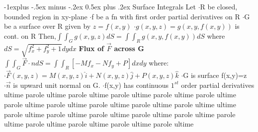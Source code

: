 \documentclass[10pt,landscape]{article}
\makeatletter
\renewcommand{\subsection}{\@startsection{subsection}{2}{0mm}%
                                {-1explus -.5ex minus -.2ex}%
                                {0.5ex plus .2ex}%
                                {\normalfont\normalsize\bfseries}}
\makeatother
\begin{document}
\begin{multicols*}{5}
\subsection{Surface Integrals}
Let\newline
$\cdot$R be closed, bounded region in xy-plane\newline
$\cdot$f be a fn with first order partial derivatives on R\newline
$\cdot$G be a surface over R given by $ z=f(x,y) $\newline
$\cdot g(x,y,z) = g(x,y,f(x,y))$ is cont. on R\newline
Then,\newline$ \int\int_G g(x,y,z) dS = \int\int_R g(x,y,f(x,y)) dS $\newline
where $ dS = \sqrt{f_x^2+f_y^2+1}dydx $\newline
\textbf{Flux of $ \vec{F} $ across G}\newline
$ \int\int_G\vec{F}\cdot{n} dS = \int\int_R[-Mf_x-Nf_y+P]dxdy $\newline
where:\newline
$\cdot\vec{F}(x,y,z) = M(x,y,z)\hat{i} + N(x,y,z)\hat{j} + P(x,y,z)\hat{k} $\newline
$\cdot$G is surface f(x,y)=z\newline
$\cdot\vec{n}$ is upward unit normal on G.\newline
$\cdot$f(x,y) has continuous $1^{st}$ order partial derivatives
 ultime parole ultime parole ultime parole ultime parole ultime parole ultime parole ultime parole ultime parole ultime parole ultime parole ultime  ultime parole ultime parole ultime parole ultime parole ultime parole ultime parole ultime parole ultime parole ultime parole ultime parole ultime 

\begin{comment}
 \subsection {Other Information}
$ \frac{\sqrt{a}}{\sqrt{b}} = \sqrt{\frac{a}{b}} $\newline
Where a Cone is defined as $ z = \sqrt{a(x^2+y^2)}, $\newline
In Spherical Coordinates, $ \phi = \cos^{-1}(\sqrt{\frac{a}{1+a}}) $\newline
Right Circular Cylinder:\newline
$ V=\pi r^2h, SA=\pi r^2+2\pi rh $\newline
$ \lim_{n\to \inf} (1+\frac{m}{n})^{pn} = e^{mp} $\newline
Law of Cosines:\newline
$ a^2 = b^2 + c^2 - 2bc(\cos(\theta)) $


\end{comment}
\end{multicols*}
\end{document}
